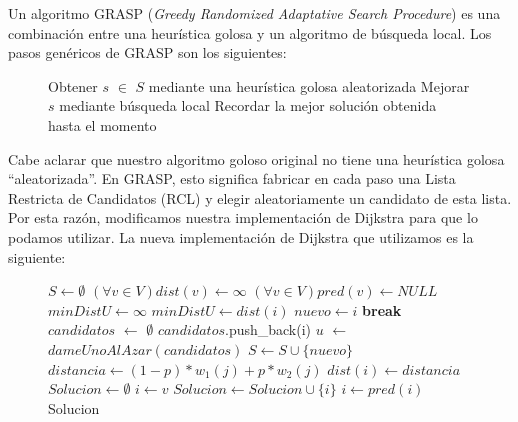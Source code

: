 Un algoritmo GRASP (\emph{Greedy Randomized Adaptative Search Procedure}) es una combinación entre una heurística golosa y un algoritmo de búsqueda local. Los pasos genéricos de GRASP son los siguientes:

\begin{center}
 \begin{figure}[H]
  \begin{pseudo}
    \State Obtener $s$ $\in$ $S$ mediante una heurística golosa aleatorizada
    \State Mejorar $s$ mediante búsqueda local
    \State Recordar la mejor solución obtenida hasta el momento
    \EndWhile
    \EndProcedure
  \end{pseudo}
 \end{figure}
\end{center}

Cabe aclarar que nuestro algoritmo goloso original no tiene una heurística golosa ``aleatorizada''. En GRASP, esto significa fabricar en cada paso una Lista Restricta de Candidatos (RCL) y elegir aleatoriamente un candidato de esta lista. Por esta razón, modificamos nuestra implementación de Dijkstra para que lo podamos utilizar. La nueva implementación de Dijkstra que utilizamos es la siguiente:


\begin{center}
 \begin{figure}[H]
  \begin{pseudo}
    \State $S \leftarrow \emptyset$
    \State $(\forall v \in V) dist(v) \leftarrow \infty$
    \State $(\forall v \in V) pred(v) \leftarrow NULL$
    \State $minDistU \leftarrow \infty$
	\State $minDistU \leftarrow dist(i)$
	\State $nuevo \leftarrow i$
      \EndIf
    \EndFor
      \State \textbf{break}
    \EndIf
    \State $candidatos$ $\leftarrow$ $\emptyset$
	\State $candidatos$.push\_back(i)
      \EndIf
    \EndFor
    \State $u$ $\leftarrow$ $dameUnoAlAzar(candidatos)$
    \State $S \leftarrow S \cup \{nuevo\}$
      \State $distancia \leftarrow (1-p)*w_1(j) + p*w_2(j)$
	\State $dist(i) \leftarrow distancia$
      \EndIf
    \EndFor
    \EndWhile
    \State $Solucion \leftarrow \emptyset$
    \State $i \leftarrow v$
      \State $Solucion \leftarrow Solucion \cup \{i\}$
      \State $i \leftarrow pred(i)$
    \EndWhile
    \Return Solucion
    \EndProcedure
  \end{pseudo}
 \end{figure}
\end{center}

